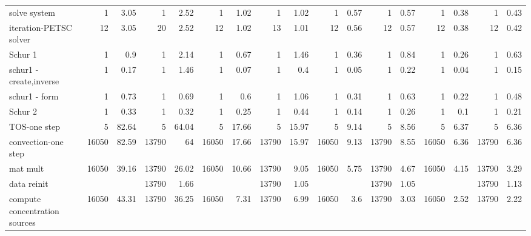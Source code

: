 \begin{sidewaystable}[!htb]
\begin{tabular}{|l|r|r|r|r|r|r|r|r|r|r|r|r|r|r|r|r|}
   solve system                      &   1   &   3.05    &   1   &   2.52    &   1   &   1.02    &   1   &   1.02    &   1   &   0.57    &   1   &   0.57    &   1   &   0.38    &   1   &   0.43    \\
    iteration-PETSC solver         &   12  &   3.05    &   20  &   2.52    &   12  &   1.02    &   13  &   1.01    &   12  &   0.56    &   12  &   0.57    &   12  &   0.38    &   12  &   0.42    \\
   Schur 1                           &   1   &   0.9 &   1   &   2.14    &   1   &   0.67    &   1   &   1.46    &   1   &   0.36    &   1   &   0.84    &   1   &   0.26    &   1   &   0.63    \\
    schur1 - create,inverse         &   1   &   0.17    &   1   &   1.46    &   1   &   0.07    &   1   &   0.4 &   1   &   0.05    &   1   &   0.22    &   1   &   0.04    &   1   &   0.15    \\
    schur1 - form                   &   1   &   0.73    &   1   &   0.69    &   1   &   0.6 &   1   &   1.06    &   1   &   0.31    &   1   &   0.63    &   1   &   0.22    &   1   &   0.48    \\
   Schur 2                            &   1   &   0.33    &   1   &   0.32    &   1   &   0.25    &   1   &   0.44    &   1   &   0.14    &   1   &   0.26    &   1   &   0.1 &   1   &   0.21    \\
  TOS-one step                        &   5   &   82.64   &   5   &   64.04   &   5   &   17.66   &   5   &   15.97   &   5   &   9.14    &   5   &   8.56    &   5   &   6.37    &   5   &   6.36    \\
   convection-one step               &   16050   &   82.59   &   13790   &   64  &   16050   &   17.66   &   13790   &   15.97   &   16050   &   9.13    &   13790   &   8.55    &   16050   &   6.36    &   13790   &   6.36    \\
    mat mult                        &   16050   &   39.16   &   13790   &   26.02   &   16050   &   10.66   &   13790   &   9.05    &   16050   &   5.75    &   13790   &   4.67    &   16050   &   4.15    &   13790   &   3.29    \\
    data reinit                     &           &           &   13790   &   1.66    &           &           &   13790   &   1.05    &           &           &   13790   &   1.05    &           &           &   13790   &   1.13    \\
    compute concentration sources   &   16050   &   43.31   &   13790   &   36.25   &   16050   &   7.31    &   13790   &   6.99    &   16050   &   3.6 &   13790   &   3.03    &   16050   &   2.52    &   13790   &   2.22    \\

\end{tabular}
\end{sidewaystable}
